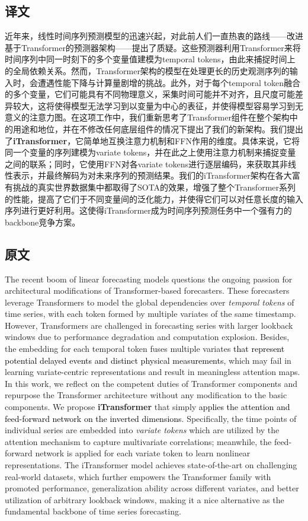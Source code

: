 \documentclass[twoside,12pt]{article}
\newcommand{\update}[1]{{\textcolor{black}{#1}}}
\begin{document}
\subsection{译文}
近年来，线性时间序列预测模型的迅速兴起，对此前人们一直热衷的路线——改进基于Transformer的预测器架构——提出了质疑。这些预测器利用Transformer来将时间序列中同一时刻下的多个变量值建模为temporal tokens，由此来捕捉时间上的全局依赖关系。然而，Transformer架构的模型在处理更长的历史观测序列的输入时，会遭遇性能下降与计算量剧增的挑战。此外，对于每个temporal token融合的多个变量，它们可能具有不同物理意义，采集时间可能并不对齐，且尺度可能差异较大，这将使得模型无法学习到以变量为中心的表征，并使得模型容易学习到无意义的注意力图。在这项工作中，我们重新思考了Transformer组件在整个架构中的用途和地位，并在不修改任何底层组件的情况下提出了我们的新架构。我们提出了\textbf{iTransformer}，它简单地互换注意力机制和FFN作用的维度。具体来说，它将同一个变量的序列建模为variate tokens，并在此之上使用注意力机制来捕捉变量之间的联系；同时，它使用FFN对各variate tokens进行逐层编码，来获取其非线性表示，并最终解码为对未来序列的预测结果。我们的iTransformer架构在各大富有挑战的真实世界数据集中都取得了SOTA的效果，增强了整个Transformer系列的性能，提高了它们于不同变量间的泛化能力，并使得它们可以对任意长度的输入序列进行更好利用。这使得iTransformer成为时间序列预测任务中一个强有力的backbone竞争方案。

\subsection{原文}
The recent boom of linear forecasting models questions the ongoing passion for architectural modifications of Transformer-based forecasters. These forecasters leverage Transformers to model the global dependencies over \emph{temporal tokens} of time series, with each token formed by multiple variates of the same timestamp. However, Transformers are challenged in forecasting series with larger lookback windows due to performance degradation and computation explosion. Besides, the embedding for each temporal token fuses multiple variates \update{that represent potential delayed events and distinct physical measurements}, which may fail in learning variate-centric representations and result in meaningless attention maps. In this work, we reflect on the competent duties of Transformer components and repurpose the Transformer architecture without any modification to the basic components. We propose \textbf{iTransformer} that simply \update{applies the attention and feed-forward network on the inverted dimensions}. Specifically, the time points of individual series are embedded into \emph{variate tokens} which are utilized by the attention mechanism to capture multivariate correlations; meanwhile, the feed-forward network is applied for each variate token to learn nonlinear representations. The iTransformer model achieves state-of-the-art on challenging real-world datasets, which further empowers the Transformer family with promoted performance, generalization ability across different variates, and better utilization of arbitrary lookback windows, making it a nice alternative as the fundamental backbone of time series forecasting.
\end{document}
